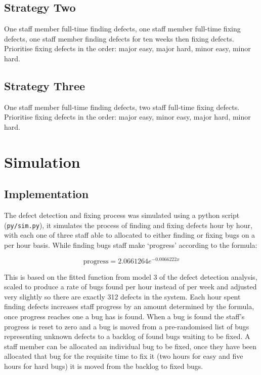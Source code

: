 \documentclass[12pt,a4paper]{article}
\begin{document}
	
	\subsection{Strategy Two}
		One staff member full-time finding defects, one staff member full-time fixing defects, one staff member finding defects for ten weeks then fixing defects. Prioritise fixing defects in the order: major easy, major hard, minor easy, minor hard.
	
	
	\subsection{Strategy Three}
		One staff member full-time finding defects, two staff full-time fixing defects. Prioritise fixing defects in the order: major easy, minor easy, major hard, minor hard.


	
	\section{Simulation}

	
	\subsection{Implementation}
		The defect detection and fixing process was simulated using a python script (\texttt{py/sim.py}), it simulates the process of finding and fixing defects hour by hour, with each one of three staff able to allocated to either finding or fixing bugs on a per hour basis. While finding bugs staff make `progress' according to the formula:
	
		\[
			\text{progress} = 2.0661264 e ^ {-0.0066222x}
		\]
	
		This is based on the fitted function from model 3 of the defect detection analysis, scaled to produce a rate of bugs found per hour instead of per week and adjusted very slightly so there are exactly 312 defects in the system. Each hour spent finding defects increases staff progress by an amount determined by the formula, once progress reaches one a bug has is found. When a bug is found the staff's progress is reset to zero and a bug is moved from a pre-randomised list of bugs representing unknown defects to a backlog of found bugs waiting to be fixed. A staff member can be allocated an individual bug to be fixed, once they have been allocated that bug for the requisite time to fix it (two hours for easy and five hours for hard bugs) it is moved from the backlog to fixed bugs.
\end{document}
